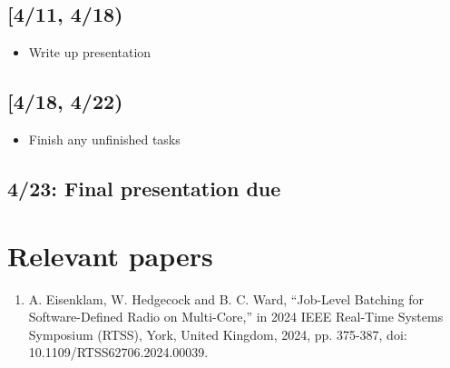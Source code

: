 \documentclass[11pt]{article}
\begin{document}
\subsection{{[}4/11, 4/18)}
\label{sec:org49d7c92}
\begin{itemize}
\item Write up presentation
\end{itemize}
\subsection{{[}4/18, 4/22)}
\label{sec:org688a064}
\begin{itemize}
\item Finish any unfinished tasks
\end{itemize}
\subsection{4/23: Final presentation due}
\label{sec:org5f83f0b}
\section{Relevant papers}
\label{sec:org2727af5}
\begin{enumerate}
\item A. Eisenklam, W. Hedgecock and B. C. Ward, ``Job-Level Batching for Software-Defined Radio on Multi-Core,'' in 2024 IEEE Real-Time Systems Symposium (RTSS), York, United Kingdom, 2024, pp. 375-387, doi: 10.1109/RTSS62706.2024.00039.
\end{enumerate}
\end{document}
